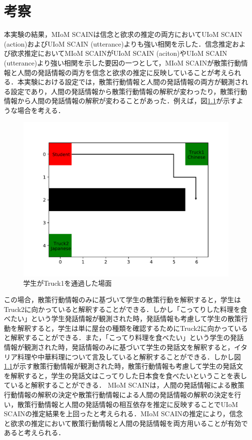 \chapter{考察}
\par
本実験の結果，MIoM SCAINは信念と欲求の推定の両方においてUIoM SCAIN (action)およびUIoM SCAIN (utterance)よりも強い相関を示した．信念推定および欲求推定においてMIoM SCAINがUIoM SCAIN (aciton)やUIoM SCAIN (utterance)より強い相関を示した要因の一つとして，MIoM SCAINが散策行動情報と人間の発話情報の両方を信念と欲求の推定に反映していることが考えられる．本実験における設定では，散策行動情報と人間の発話情報の両方が観測される設定であり，人間の発話情報から散策行動情報の解釈が変わったり，散策行動情報から人間の発話情報の解釈が変わることがあった．例えば，図\ref{fig:ex_env2}が示すような場合を考える．
\begin{figure}[htbp]
  \begin{center}
    \includegraphics[scale=0.48]{./ex_env2.pdf}
    \caption{学生がTruck1を通過した場面}
    \label{fig:ex_env2}
  \end{center}
\end{figure}
この場合，散策行動情報のみに基づいて学生の散策行動を解釈すると，学生はTruck2に向かっていると解釈することができる．しかし「こってりした料理を食べたい」という学生発話情報が観測された時，発話情報も考慮して学生の散策行動を解釈すると，学生は単に屋台の種類を確認するためにTruck2に向かっていると解釈することができる．また，「こってり料理を食べたい」という学生の発話情報が観測された時，発話情報のみに基づいて学生の発話文を解釈すると，イタリア料理や中華料理について言及していると解釈することができる．しかし図\ref{fig:ex_env2}が示す散策行動情報が観測された時，散策行動情報も考慮して学生の発話文を解釈すると，学生の発話文はこってりした日本食を食べたいということを表していると解釈することができる．
MIoM SCAINは，人間の発話情報による散策行動情報の解釈の決定や散策行動情報による人間の発話情報の解釈の決定を行い，散策行動情報と人間の発話情報の相互依存を推定に反映することでUIoM SCAINの推定結果を上回ったと考えられる．MIoM SCAINの推定により，信念と欲求の推定において散策行動情報と人間の発話情報を両方用いることが有効であると考えられる．

